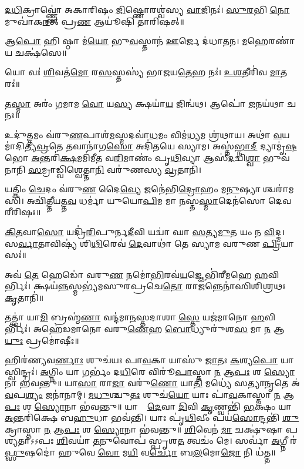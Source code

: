 \ul{𑌦}\ul{𑌧𑌿}𑌕𑍍𑌰𑌾𑌵𑍍𑌣𑍍𑌣𑍋॑ 𑌅𑌕𑌾𑌰𑌿𑌷𑌂 \ul{𑌜𑌿}𑌷𑍍𑌣𑍋𑌰𑌶𑍍𑌵॑𑌸𑍍𑌯 \ul{𑌵𑌾}𑌜𑌿𑌨𑌃॑।
\ul{𑌸𑍁}\ul{𑌰}𑌭𑌿 \ul{𑌨𑍋} 𑌮𑍁𑌖𑌾॑𑌕\ul{𑌰}𑌤𑍍 𑌪𑍍𑌰\ul{𑌣} 𑌆𑌯𑍂॑𑌷𑌿 𑌤𑌾𑌰𑌿𑌷𑌤𑍍॥

𑌆\ul{𑌪𑍋} 𑌹𑌿 𑌷𑍍𑌠𑌾 𑌮॑\ul{𑌯𑍋} 𑌭𑍁\ul{𑌵}𑌸𑍍𑌤𑌾𑌨॑ \ul{𑌊}𑌰𑍍𑌜𑍇 𑌦॑𑌧𑌾𑌤𑌨। \ul{𑌮}𑌹𑍇𑌰𑌣𑌾॑𑌯 𑌚𑌕𑍍𑌷॑𑌸𑍇॥

𑌯𑍋 𑌵𑌃॑ \ul{𑌶𑌿}𑌵𑌤॑\ul{𑌮𑍋} 𑌰\ul{𑌸}𑌸𑍍𑌤𑌸𑍍𑌯॑ 𑌭𑌾𑌜𑌯\ul{𑌤𑍇}𑌹 𑌨𑌃॑। \ul{𑌉}\ul{𑌶}𑌤𑍀𑌰𑌿॑𑌵 \ul{𑌮𑌾}𑌤𑌰𑌃॑॥

𑌤\ul{𑌸𑍍𑌮𑌾} 𑌅𑌰𑌂॑ 𑌗𑌮𑌾𑌮 \ul{𑌵𑍋} 𑌯\ul{𑌸𑍍𑌯} 𑌕𑍍𑌷𑌯𑌾॑\ul{𑌯} 𑌜𑌿𑌨𑍍𑌵॑𑌥। 𑌆𑌪𑍋॑ \ul{𑌜}𑌨𑌯॑𑌥𑌾 𑌚 𑌨𑌃॥

𑌉𑌦𑍁॑\ul{𑌤𑍍𑌤}𑌮𑌂 𑌵॑𑌰𑍁\ul{𑌣}𑌪𑌾𑌶॑\ul{𑌮}𑌸𑍍𑌮𑌦𑌵𑌾॑\ul{𑌧}𑌮𑌂 𑌵𑌿𑌮॑\ul{𑌧𑍍𑌯}𑌮 𑌶𑍍𑌰॑𑌥𑌾𑌯।
𑌅𑌥𑌾॑ \ul{𑌵}𑌯𑌮𑌾॑𑌦𑌿𑌤𑍍𑌯\ul{𑌵𑍍𑌰}𑌤𑍇 𑌤𑌵𑌾𑌨𑌾॑𑌗\ul{𑌸𑍋} 𑌅𑌦𑌿॑𑌤𑌯𑍇 𑌸𑍍𑌯𑌾𑌮।
𑌅𑌸𑍍𑌤॑\ul{𑌭𑍍𑌨𑌾}\ul{𑌦𑍍} 𑌦𑍍𑌯𑌾𑌮𑍃॑\ul{𑌷}𑌭𑍋 \ul{𑌅}𑌨𑍍𑌤𑌰𑌿॑\ul{𑌕𑍍𑌷}𑌮𑌮𑌿॑𑌮𑍀𑌤 𑌵\ul{𑌰𑌿}𑌮𑌾𑌣𑌂॑ 𑌪𑍃\ul{𑌥𑌿}𑌵𑍍𑌯𑌾
𑌆𑌸𑍀॑\ul{𑌦}𑌦𑍍𑌵𑌿\ul{𑌶𑍍𑌵𑌾} 𑌭𑍁𑌵॑𑌨𑌾𑌨𑌿 \ul{𑌸}𑌮𑍍𑌰𑌾𑌡𑍍𑌵𑌿𑌶𑍍𑌵𑍇𑌤𑍍𑌤𑌾\ul{𑌨𑌿} 𑌵𑌰𑍁॑𑌣𑌸𑍍𑌯 \ul{𑌵𑍍𑌰}𑌤𑌾𑌨𑌿॑।

𑌯𑌤𑍍𑌕𑌿𑌂 \ul{𑌚𑍇}𑌦𑌂 𑌵॑𑌰𑍁\ul{𑌣} 𑌦𑍈\ul{𑌵𑍍𑌯𑍇} 𑌜𑌨𑍇॑𑌭𑌿\ul{𑌦𑍍𑌰𑍋}𑌹𑌂 𑌮\ul{𑌨𑍁}𑌷𑍍𑌯𑌾𑌶𑍍𑌚𑌰𑌾॑𑌮𑌸𑌿। 
𑌅𑌚𑌿॑\ul{𑌤𑍍𑌤𑍀}𑌯𑌤𑍍𑌤\ul{𑌵} 𑌧𑌰𑍍𑌮𑌾॑ 𑌯𑍁𑌯𑍋\ul{𑌪𑌿}𑌮 𑌮𑌾 \ul{𑌨}𑌸𑍍𑌤\ul{𑌸𑍍𑌮𑌾}𑌦𑍇𑌨॑𑌸𑍋 𑌦𑍇𑌵 𑌰𑍀𑌰𑌿𑌷𑌃॥

\ul{𑌕𑌿}\ul{𑌤}𑌵𑌾\ul{𑌸𑍋} 𑌯𑌦𑍍𑌰𑌿॑\ul{𑌰𑌿}𑌪𑍁𑌰𑍍𑌨\ul{𑌦𑍀}𑌵𑌿 𑌯𑌦𑍍𑌵𑌾॑ 𑌘𑌾 \ul{𑌸}𑌤𑍍𑌯\ul{𑌮𑍁}𑌤 𑌯𑌂 𑌨 \ul{𑌵𑌿}𑌦𑍍𑌮। 
𑌸\ul{𑌰𑍍𑌵𑌾}𑌤𑌾𑌵𑌿𑌷𑍍𑌯॑ 𑌶𑌿\ul{𑌥𑌿}𑌰𑍇𑌵॑ \ul{𑌦𑍇}𑌵𑌾𑌥𑌾॑ 𑌤𑍇 𑌸𑍍𑌯𑌾𑌮 𑌵𑌰𑍁𑌣 \ul{𑌪𑍍𑌰𑌿}𑌯𑌾𑌸𑌃॑॥

𑌅𑌵॑ \ul{𑌤𑍇} 𑌹𑍇𑌡𑍋॑ 𑌵𑌰𑍁\ul{𑌣} 𑌨𑌮𑍋॑\ul{𑌭𑌿}𑌰𑌵॑\ul{𑌯}𑌜𑍍𑌞𑍇𑌭𑌿॑𑌰𑍀𑌮𑌹𑍇 \ul{𑌹}𑌵𑌿𑌰𑍍𑌭𑌿𑌃॑।
𑌕𑍍𑌷𑌯॑\ul{𑌨𑍍𑌨}𑌸𑍍𑌮𑌭𑍍𑌯॑𑌮𑌸𑍁𑌰𑌪𑍍𑌰𑌚𑍇\ul{𑌤𑍋} 𑌰𑌾\ul{𑌜}𑌨𑍍𑌨𑍇𑌨𑌾॑𑌸𑌿𑌶𑌿𑌶𑍍𑌰𑌥𑌃 \ul{𑌕𑍃}𑌤𑌾𑌨𑌿॑॥

𑌤𑌤𑍍𑌤𑍍𑌵𑌾॑ 𑌯𑌾\ul{𑌮𑌿} 𑌬𑍍𑌰𑌹𑍍𑌮॑\ul{𑌣𑌾} 𑌵𑌨𑍍𑌦॑𑌮𑌾\ul{𑌨}𑌸𑍍𑌤𑌦𑌾𑌶𑌾\ul{𑌸𑍍𑌤𑍇} 𑌯𑌜॑𑌮𑌾𑌨𑍋 \ul{𑌹}𑌵𑌿𑌰𑍍𑌭𑌿𑌃॑। 
𑌅𑌹𑍇॑𑌡𑌮𑌾𑌨𑍋 𑌵𑌰𑍁\ul{𑌣𑍇}𑌹 \ul{𑌬𑍋}𑌧𑍍𑌯𑍁𑌰𑍁॑𑌶\ul{𑌸} 𑌮𑌾 \ul{𑌨} 𑌆\ul{𑌯𑍁𑌃} 𑌪𑍍𑌰𑌮𑍋॑𑌷𑍀𑌃॥

𑌹𑌿𑌰॑𑌣𑍍𑌯𑌵\ul{𑌰𑍍𑌣𑌾𑌃} 𑌶𑍁𑌚॑𑌯𑌃 𑌪𑌾\ul{𑌵}𑌕𑌾 𑌯𑌾𑌸𑍁॑ \ul{𑌜𑌾}𑌤𑌃 \ul{𑌕}𑌶𑍍𑌯\ul{𑌪𑍋} 𑌯𑌾𑌸𑍍𑌵𑌿𑌨𑍍𑌦𑍍𑌰𑌃॑।
\ul{𑌅}𑌗𑍍𑌨𑌿𑌂 𑌯𑌾 𑌗𑌰𑍍𑌭𑌂॑ 𑌦\ul{𑌧𑌿}𑌰𑍇 𑌵𑌿𑌰𑍂॑\ul{𑌪𑌾}𑌸𑍍𑌤𑌾 \ul{𑌨} 𑌆\ul{𑌪𑌃} 𑌶 \ul{𑌸𑍍𑌯𑍋}𑌨𑌾 𑌭॑𑌵𑌨𑍍𑌤𑍁॥ 
𑌯𑌾\ul{𑌸𑌾}\ul{} 𑌰𑌾\ul{𑌜𑌾} 𑌵𑌰𑍁॑\ul{𑌣𑍋} 𑌯𑌾\ul{𑌤𑌿} 𑌮𑌧𑍍𑌯𑍇॑ 𑌸𑌤𑍍𑌯𑌾\ul{𑌨𑍃}𑌤𑍇 𑌅॑\ul{𑌵}𑌪\ul{𑌶𑍍𑌯𑌂} 𑌜𑌨𑌾॑𑌨𑌾𑌮𑍍।
\ul{𑌮}\ul{𑌧𑍁}𑌶𑍍𑌚𑍁\ul{𑌤𑌃} 𑌶𑍁𑌚॑\ul{𑌯𑍋} 𑌯𑌾𑌃 𑌪𑌾॑\ul{𑌵}𑌕𑌾𑌸𑍍𑌤𑌾 \ul{𑌨} 𑌆\ul{𑌪𑌃} 𑌶 \ul{𑌸𑍍𑌯𑍋}𑌨𑌾 𑌭॑𑌵𑌨𑍍𑌤𑍁॥ 
𑌯𑌾𑌸𑌾𑌂᳚ \ul{𑌦𑍇}𑌵𑌾 \ul{𑌦𑌿}𑌵𑌿 \ul{𑌕𑍃}𑌣𑍍𑌵𑌨𑍍𑌤𑌿॑ \ul{𑌭}𑌕𑍍𑌷𑌂 𑌯𑌾 \ul{𑌅}𑌨𑍍𑌤𑌰𑌿॑𑌕𑍍𑌷𑍇 𑌬\ul{𑌹𑍁}𑌧𑌾 𑌭𑌵॑𑌨𑍍𑌤𑌿।
𑌯𑌾𑌃 𑌪𑍃॑\ul{𑌥𑌿}𑌵𑍀𑌂 𑌪𑌯॑\ul{𑌸𑍋}𑌨𑍍𑌦𑌨𑍍𑌤𑌿॑ \ul{𑌶𑍁}𑌕𑍍𑌰𑌾𑌸𑍍𑌤𑌾 \ul{𑌨} 𑌆\ul{𑌪𑌃} 𑌶 \ul{𑌸𑍍𑌯𑍋}𑌨𑌾 𑌭॑𑌵𑌨𑍍𑌤𑍁॥ 
\ul{𑌶𑌿}𑌵𑍇𑌨॑ \ul{𑌮𑌾} 𑌚𑌕𑍍𑌷𑍁॑𑌷𑌾 𑌪𑌶𑍍𑌯𑌤𑌾𑌽𑌽𑌪𑌃 \ul{𑌶𑌿}𑌵𑌯𑌾॑ \ul{𑌤}𑌨𑍁𑌵𑍋𑌪॑ 𑌸𑍍𑌪𑍃𑌶\ul{𑌤} 𑌤𑍍𑌵𑌚𑌂॑ 𑌮𑍇।
𑌸𑌰𑍍𑌵𑌾॑ \ul{𑌅}𑌗𑍍𑌨𑍀 𑌰॑\ul{𑌫𑍍𑌸𑍁}𑌷𑌦𑍋॑ 𑌹𑍁𑌵𑍇 \ul{𑌵𑍋} 𑌮\ul{𑌯𑌿} 𑌵\ul{𑌰𑍍𑌚𑍋} 𑌬\ul{𑌲}𑌮𑍋\ul{𑌜𑍋} 𑌨𑌿 𑌧॑𑌤𑍍𑌤॥

